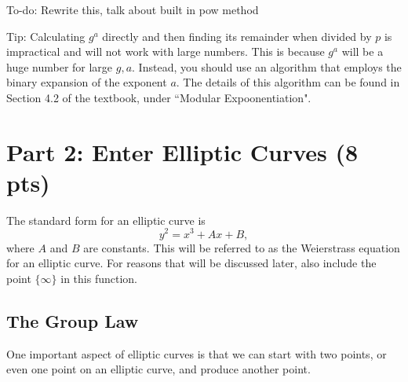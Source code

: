\documentclass{article}
\begin{document}
\begin{tcolorbox}[enhanced,interior style={top color=Plum!20,bottom color=Plum!30}]
        \vspace{2mm}

        To-do: Rewrite this, talk about built in pow method


        Tip: Calculating $g^{a}$ directly and then finding its remainder when divided by $p$ is impractical and will not work with large numbers. This is because $g^{a}$ will be a huge number for large $g, a$. Instead, you should use an algorithm that employs the binary expansion of the exponent $a$. The details of this algorithm can be found in Section 4.2 of the textbook, under ``Modular Expoonentiation".
    \end{tcolorbox}



\section*{Part 2: Enter Elliptic Curves (8 pts)}

The standard form for an elliptic curve is $$y^{2} = x^{3} + Ax + B,$$ where $A$ and $B$ are constants.  This will be referred to as the Weierstrass equation for an elliptic curve. For reasons that will be discussed later, also include the point $\{\infty\}$ in this function.

\subsection*{The Group Law}
    One important aspect of elliptic curves is that we can start with two points, or even one point on an elliptic curve, and produce another point.
\end{document}
